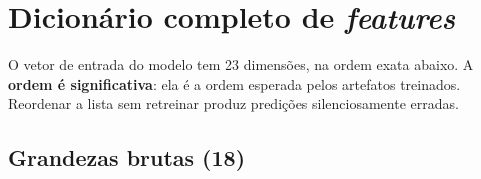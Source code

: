 \chapter{Dicionário completo de \textit{features}}
\label{ap:features}

O vetor de entrada do modelo tem 23 dimensões, na ordem exata abaixo. A
\textbf{ordem é significativa}: ela é a ordem esperada pelos artefatos
treinados. Reordenar a lista sem retreinar produz predições silenciosamente
erradas.

\section{Grandezas brutas (18)}

